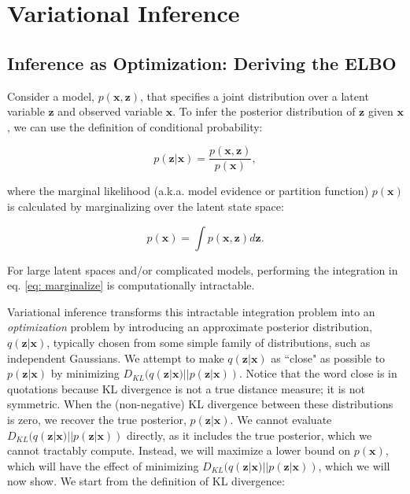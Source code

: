 \chapter{Variational Inference}
\label{chap: variational inference}

\section{Inference as Optimization: Deriving the ELBO}

Consider a model, $p(\mathbf{x}, \mathbf{z})$, that specifies a joint distribution over a latent variable $\mathbf{z}$ and observed variable $\mathbf{x}$. To infer the posterior distribution of $\mathbf{z}$ given $\mathbf{x}$, we can use the definition of conditional probability:

\begin{equation}
	p (\mathbf{z} | \mathbf{x}) = \frac{p(\mathbf{x}, \mathbf{z})}{p (\mathbf{x})},
	\label{eq: bayes rule}
\end{equation}

\noindent where the marginal likelihood (a.k.a. model evidence or partition function) $p(\mathbf{x})$ is calculated by marginalizing over the latent state space:

\begin{equation}
	p (\mathbf{x}) = \int p(\mathbf{x}, \mathbf{z}) d\mathbf{z}.
	\label{eq: marginalize}
\end{equation}

 \noindent For large latent spaces and/or complicated models, performing the integration in eq. \ref{eq: marginalize} is computationally intractable.
 
 Variational inference transforms this intractable integration problem into an \textit{optimization} problem by introducing an approximate posterior distribution, $q (\mathbf{z} | \mathbf{x})$, typically chosen from some simple family of distributions, such as independent Gaussians. We attempt to make $q (\mathbf{z} | \mathbf{x})$ as ``close" as possible to $p (\mathbf{z} | \mathbf{x})$ by minimizing $ D_{KL}(q (\mathbf{z} | \mathbf{x}) || p (\mathbf{z} | \mathbf{x}))$. Notice that the word close is in quotations because KL divergence is not a true distance measure; it is not symmetric. When the (non-negative) KL divergence between these distributions is zero, we recover the true posterior, $p (\mathbf{z} | \mathbf{x})$. We cannot evaluate $ D_{KL}(q (\mathbf{z} | \mathbf{x}) || p (\mathbf{z} | \mathbf{x}))$ directly, as it includes the true posterior, which we cannot tractably compute. Instead, we will maximize a lower bound on $p(\mathbf{x})$, which will have the effect of minimizing $ D_{KL}(q (\mathbf{z} | \mathbf{x}) || p (\mathbf{z} | \mathbf{x}))$, which we will now show. We start from the definition of KL divergence:
 
